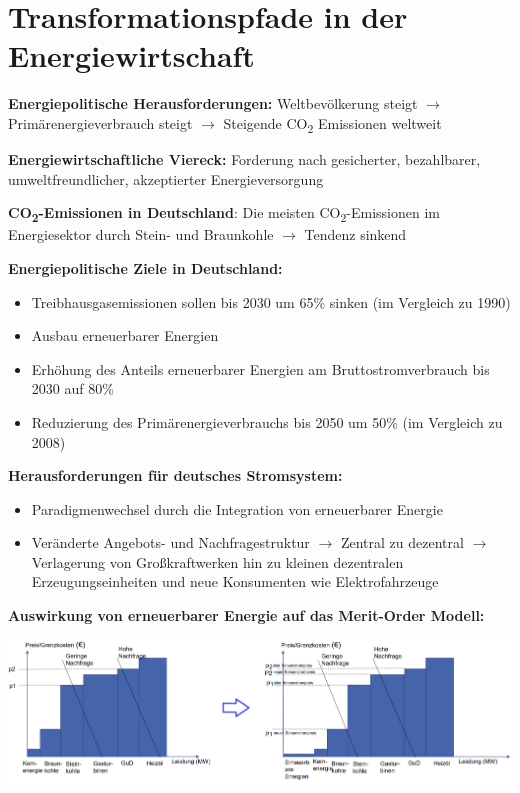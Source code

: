 \section{Transformationspfade in der Energiewirtschaft}

\textbf{Energiepolitische Herausforderungen:} Weltbevölkerung steigt $\rightarrow$ Primärenergieverbrauch steigt $\rightarrow$ Steigende CO\textsubscript{2} Emissionen weltweit

\textbf{Energiewirtschaftliche Viereck:} Forderung nach gesicherter, bezahlbarer, umweltfreundlicher, akzeptierter Energieversorgung

\textbf{CO\textsubscript{2}-Emissionen in Deutschland}: Die meisten CO\textsubscript{2}-Emissionen im Energiesektor durch Stein- und Braunkohle $\rightarrow$ Tendenz sinkend

\textbf{Energiepolitische Ziele in Deutschland:}
\begin{itemize}
	\item Treibhausgasemissionen sollen bis 2030 um 65\% sinken (im Vergleich zu 1990)
	\item Ausbau erneuerbarer Energien
	\item Erhöhung des Anteils erneuerbarer Energien am Bruttostromverbrauch bis 2030 auf 80\%
	\item Reduzierung des Primärenergieverbrauchs bis 2050 um 50\% (im Vergleich zu 2008)
\end{itemize}
\bigskip
\textbf{Herausforderungen für deutsches Stromsystem:}
\begin{itemize}
	\item Paradigmenwechsel durch die Integration von erneuerbarer Energie
	\item Veränderte Angebots- und Nachfragestruktur $\rightarrow$ Zentral zu dezentral $\rightarrow$ Verlagerung von Großkraftwerken hin zu kleinen dezentralen Erzeugungseinheiten und neue Konsumenten wie Elektrofahrzeuge
\end{itemize}
\bigskip
\textbf{Auswirkung von erneuerbarer Energie auf das Merit-Order Modell:}
\begin{center}
	\includegraphics[width=\textwidth]{images/merit-order.png}
\end{center}
